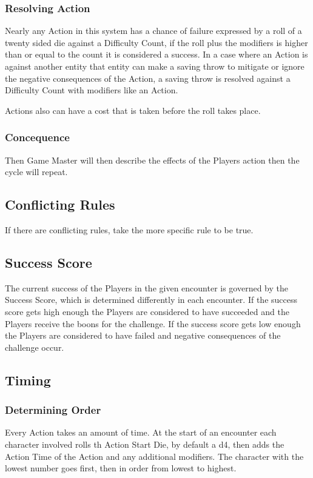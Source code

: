 \documentclass[a4paper,12pt,oneside]{book}
\begin{document}
                \subsubsection{Resolving Action}
                Nearly any Action in this system has a chance of failure expressed by a roll of a twenty sided die against a Difficulty Count, if the roll plus the modifiers is higher than or equal to the count it is considered a success. In a case where an Action is against another entity that entity can make a saving throw to mitigate or ignore the negative consequences of the Action, a saving throw is resolved against a Difficulty Count with modifiers like an Action.

                Actions also can have a cost that is taken before the roll takes place.

                \subsubsection{Concequence}
                Then Game Master will then describe the effects of the Players action then the cycle will repeat.

            \subsection{Conflicting Rules}
                If there are conflicting rules, take the more specific rule to be true.

            \subsection{Success Score}
                The current success of the Players in the given encounter is governed by the Success Score, which is determined differently in each encounter. If the success score gets high enough the Players are considered to have succeeded and the Players receive the boons for the challenge. If the success score gets low enough the Players are considered to have failed and negative consequences of the challenge occur.
            
            \subsection{Timing}
                \subsubsection{Determining Order}
                    Every Action takes an amount of time. At the start of an encounter each character involved rolls th Action Start Die, by default a d4, then adds the Action Time of the Action and any additional modifiers. The character with the lowest number goes first, then in order from lowest to highest.
\end{document}
